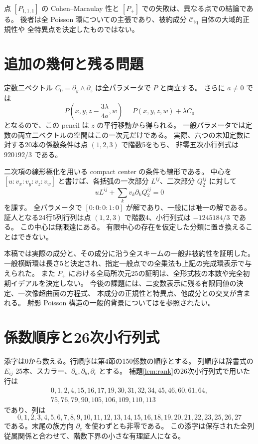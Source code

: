 \documentclass[11pt,a4paper]{ltjsarticle}
\newcommand{\cC}{\mathcal C_{\mathrm{tq}}}
\theoremstyle{remark}
\begin{document}
点 $[P_{1,1,1}]$ の Cohen--Macaulay 性と $[P_+]$ での失敗は、異なる点での結論である。
後者は全 Poisson 環についての主張であり、被約成分 $\cC$ 自体の大域的正規性や
全特異点を決定したものではない。

\section{追加の幾何と残る問題}

定数二ベクトル $C_0=\partial_y\wedge\partial_z$ は全パラメータで $P$ と両立する。
さらに $a\ne0$ では
\[
 P\left(x,y,z-\frac{3\lambda}{4a},w\right)=P(x,y,z,w)+\lambda C_0
\]
となるので、この pencil は $z$ の平行移動から得られる。
一般パラメータでは定数の両立二ベクトルの空間はこの一次元だけである。
実際、六つの未知定数に対する20本の係数条件は点 $(1,2,3)$ で階数5をもち、
非零五次小行列式は $920192/3$ である。

二次項の線形極化を用いる compact center の条件も線形である。
中心を $[u:v_x:v_y:v_z:v_w]$ と書けば、各括弧の一次部分 $L^{ij}$、二次部分 $Q^{ij}_2$ に対して
\[
 uL^{ij}+\sum_kv_k\partial_kQ^{ij}_2=0
\]
を課す。
全パラメータで $[0:0:0:1:0]$ が解であり、一般には唯一の解である。
証人となる24行5列行列は点 $(1,2,3)$ で階数4、小行列式は $-1245184/3$ である。
この中心は無限遠にある。
有限中心の存在を仮定した分類に置き換えることはできない。

本稿では実際の成分と、その成分に沿う全スキームの一般非被約性を証明した。
一般横断環は長さ5と決定され、指定一般点での全乗法も上記の完成環表示で与えられた。
また $P_+$ における全局所次元25の証明は、全形式枝の本数や完全初期イデアルを決定しない。
今後の課題には、二変数表示に残る有限同値の決定、一次像超曲面の方程式、
本成分の正規性と特異点、他成分との交叉が含まれる。
射影 Poisson 構造の一般的背景については\cite{pym}を参照されたい。

\appendix
\section{係数順序と26次小行列式}\label{app:rank}

添字は0から数える。行順序は第4節の150係数の順序とする。
列順序は辞書式の $E_{ij}$ 25本、スカラー、$\partial_a,\partial_b,\partial_c$ とする。
補題\ref{lem:rank}の26次小行列式で用いた行は
\[
\begin{gathered}
0,1,2,4,15,16,17,19,30,31,32,34,45,46,60,61,64,\\
75,76,79,90,105,106,109,110,113
\end{gathered}
\]
であり、列は
\[
0,1,2,3,4,5,6,7,8,9,10,11,12,13,14,15,16,18,19,20,21,22,23,25,26,27
\]
である。末尾の族方向 $\partial_c$ を使わずとも非零である。
この添字は保存された全列従属関係と合わせて、階数下界の小さな有理証人になる。
\end{document}
